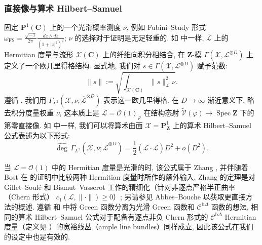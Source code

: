 \subsubsection{直接像与算术 Hilbert--Samuel}\label{sec:7.3.3}

固定 \(\mathbf{P}^1(\mathbf{C})\) 上的一个光滑概率测度 \(\nu\), 
例如 Fubini--Study 形式 \(\omega_{\mathrm{FS}} = \frac{\sqrt{-1}}{2\pi} \frac{dz \wedge d\bar{z}}{(1+|z|^2)^2}\); 
\(\nu\) 的选择对于证明是无足轻重的. 
如 \cite[第 6 节]{BC22} 中一样, \(\overline{\mathcal{L}}\) 上的 Hermitian 度量与流形 \(\mathcal{X}(\mathbf{C})\) 上的纤维向积分相结合, 
在 \(\mathbf{Z}\)-模 \(\Gamma(\mathcal{X}, \mathcal{L}^{\otimes D})\) 上定义了一个欧几里得格结构. 
显式地, 我们对 \(s \in \Gamma(\mathcal{X}, \mathcal{L}^{\otimes D})\) 赋予范数:
\[ \|s\| := \sqrt{\int_{\mathcal{X}(\mathbf{C})} \|s\|_{\mathcal{L}}^2 \nu}. \]
遵循 \cite[第 6.1.2.2 节]{BC22}, 我们用 \(\Gamma_{L^2}\left(\mathcal{X},\nu;\overline{\mathcal{L}}^{\otimes D}\right)\) 表示这一欧几里得格. 
在 \(D\to\infty\) 渐近意义下, 略去积分度量权重 \(\nu\), 
这本质上是 \(\overline{\mathcal{L}}=\overline{\mathcal{O}}(1)_{\varphi}\) 在结构态射 \(\widetilde{\mathcal{V}}(\varphi)\to\operatorname{Spec}\mathbf{Z}\) 下的第零直接像. 
如 \cite[第 8 节, 定理 8.2.5]{BC22} 中一样, 我们可以将算术曲面 \(\mathcal{X}=\mathbf{P}^1_{\mathbf{Z}}\) 上的算术 Hilbert--Samuel 公式表述为以下形式:
\begin{equation}\label{eq:7.3.4}
\widehat{\operatorname{deg}} \, \Gamma_{L^2} \left( \mathcal{X}, \nu; \overline{\mathcal{L}}^{\otimes D} \right) = \frac{1}{2} (\overline{\mathcal{L}} \cdot \overline{\mathcal{L}}) D^2 + o(D^2).
\end{equation}

当 \(\mathcal{L} = \mathcal{O}(1)\) 中的 Hermitian 度量是光滑的时, 
该公式属于 Zhang \cite[定理 1.4]{Zha95}, 
并伴随着 Bost 在 \cite[定理 10.3.2]{Bos20} 的证明中比较两种 Hermitian 度量时所作的额外输入. 
Zhang 的定理是对 Gillet--Soul{\'e} \cite{GS92} 和 Bismut--Vasserot \cite{BV89} 工作的精细化（针对非逐点严格半正曲率（Chern 形式） \(c_1(\mathcal{L}, \|\cdot\|) \geq 0\)）; 
另请参见 Abbes--Bouche \cite{AB95} 以获取更直接方法的概述. 
遵循 \cite[第 5 节]{Bos99} 和 \cite[第 3--4 节]{BC22} 中将 Green 函数分离为光滑 Green 函数和 \(\mathcal{C}^{\mathrm{b}\Delta}\) 函数的想法, 
相同的算术 Hilbert--Samuel 公式对于配备有逐点非负 Chern 形式的 \(\mathcal{C}^{\mathrm{b}\Delta}\) Hermitian 度量（定义见 \cite[第 4.2.1.2 节]{BC22}）的宽裕线丛（ample line bundles）同样成立, 
因此该公式在我们的设定中也是有效的.

